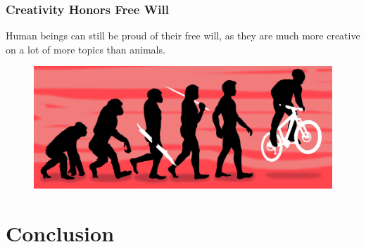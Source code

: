 \documentclass[xcolor=dvipsnames]{beamer}
\theoremstyle{definition}
\begin{document}
\begin{frame}[fragile]
  \frametitle{Creativity Honors Free Will}

  Human beings can still be proud of their free will, as they are much more creative on a lot of more topics than animals.

  \begin{figure}
    \centering
    \includegraphics[width=1\textwidth]{images/degrees.jpg}
  \end{figure}
\end{frame}




\section{Conclusion} %
\label{sec:conclusion}
\end{document}
